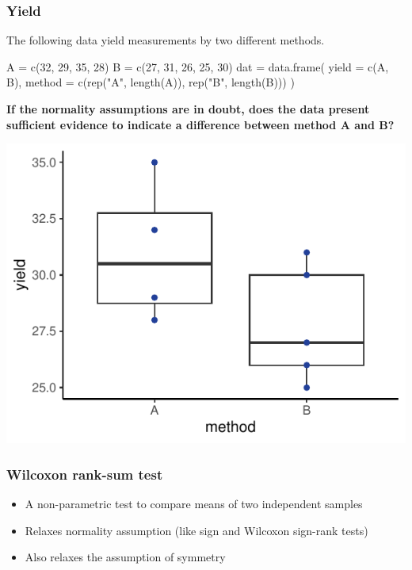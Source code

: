 \documentclass[a4paper]{article}\usepackage[]{graphicx}\usepackage[]{xcolor}
\makeatletter
\def\maxwidth{ %
  \ifdim\Gin@nat@width>\linewidth
    \linewidth
  \else
    \Gin@nat@width
  \fi
}
\makeatother
\begin{document}
\subsubsection{Yield}
The following data yield measurements by two different methods.
\begin{Schunk}
\begin{Sinput}
A = c(32, 29, 35, 28)
B = c(27, 31, 26, 25, 30)
dat = data.frame(
	yield = c(A, B),
	method = c(rep("A", length(A)),
        	   rep("B", length(B)))
)
\end{Sinput}
\end{Schunk}
\begin{greenbox}
	\textbf{If the normality assumptions are in doubt, does the data present sufficient evidence to indicate a 	difference between method A and B?}
\end{greenbox}
\begin{Schunk}


{\centering \includegraphics[width=\maxwidth]{figure/listings-unnamed-chunk-116-1} 

}

\end{Schunk}
\subsubsection{Wilcoxon rank-sum test}
\begin{itemize}
	\item A non-parametric test to compare means of two independent samples
	\item Relaxes normality assumption (like sign and Wilcoxon sign-rank tests)
	\item Also relaxes the assumption of symmetry
\end{itemize}
\end{document}
